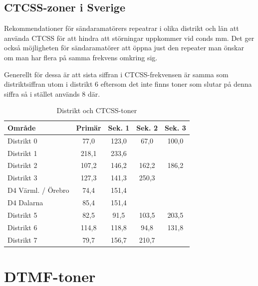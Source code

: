 \subsection{CTCSS-zoner i Sverige}

Rekommendationer för sändaramatörers repeatrar i olika distrikt och län att
använda CTCSS för att hindra att störningar uppkommer vid conds mm. Det ger
också möjligheten för sändaramatörer att öppna just den repeater man önskar om
man har flera på samma frekvens omkring sig.

Generellt för dessa är att sista siffran i CTCSS-frekvensen är samma som
distriktsiffran utom i distrikt 6 eftersom det inte finns toner som slutar
på denna siffra så i stället används 8 där.

\begin{table}[H]
\centering
\begin{tabular}{lcccc}
	\textbf{Område}    & \textbf{Primär} & \textbf{Sek. 1} & \textbf{Sek. 2} & \textbf{Sek. 3} \\ \hline
	Distrikt 0         &      77,0       &      123,0      &      67,0       &      100,0      \\
	Distrikt 1         &      218,1      &      233,6      &                 &                 \\
	Distrikt 2         &      107,2      &      146,2      &      162,2      &      186,2      \\
	Distrikt 3         &      127,3      &      141,3      &      250,3      &                 \\
	D4 Värml. / Örebro &      74,4       &      151,4      &                 &                 \\
	D4 Dalarna         &      85,4       &      151,4      &                 &                 \\
	Distrikt 5         &      82,5       &      91,5       &      103,5      &      203,5      \\
	Distrikt 6         &      114,8      &      118,8      &      94,8       &      131,8      \\
	Distrikt 7         &      79,7       &      156,7      &      210,7      &
\end{tabular}
\caption{Distrikt och CTCSS-toner}
\end{table}

\section{DTMF-toner}

